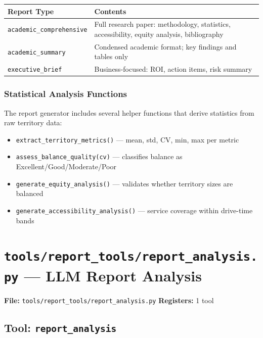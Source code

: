 \documentclass[12pt,a4paper]{report}
\begin{document}
\begin{center}
\begin{tabularx}{\linewidth}{lX}
  \toprule
  \textbf{Report Type} & \textbf{Contents} \\
  \midrule
  \texttt{academic\_comprehensive} & Full research paper: methodology, statistics, accessibility, equity analysis, bibliography \\
  \texttt{academic\_summary}       & Condensed academic format; key findings and tables only \\
  \texttt{executive\_brief}        & Business-focused: ROI, action items, risk summary \\
  \bottomrule
\end{tabularx}
\end{center}

\subsubsection{Statistical Analysis Functions}

The report generator includes several helper functions that derive statistics
from raw territory data:

\begin{itemize}[noitemsep]
  \item \texttt{extract\_territory\_metrics()} --- mean, std, CV, min, max per metric
  \item \texttt{assess\_balance\_quality(cv)} --- classifies balance as Excellent/Good/Moderate/Poor
  \item \texttt{generate\_equity\_analysis()} --- validates whether territory sizes are balanced
  \item \texttt{generate\_accessibility\_analysis()} --- service coverage within drive-time bands
\end{itemize}

\section{\texttt{tools/report\_tools/report\_analysis.py} --- LLM Report Analysis}

\begin{mdframed}[style=filebox]
\textbf{File:} \texttt{tools/report\_tools/report\_analysis.py} \quad \textbf{Registers:} 1 tool
\end{mdframed}

\subsection{Tool: \texttt{report\_analysis}}
\end{document}
